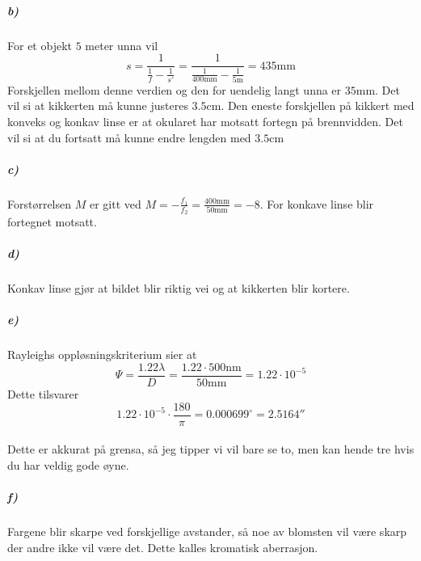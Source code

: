 \documentclass[11pt, A4paper,norsk]{article}
\begin{document}
			\subparagraph{b)}
				\begin{flushleft}
For et objekt $5$ meter unna vil
$$s = \frac{1}{\frac{1}{f} - \frac{1}{s'}} = \frac{1}{\frac{1}{400 \text{mm}} - \frac{1}{5 \text{m}}} = 435 \text{mm}$$
Forskjellen mellom denne verdien og den for uendelig langt unna er $35 \text{mm}$. Det vil si at kikkerten må kunne justeres $3.5 \text{cm}$. Den eneste forskjellen på kikkert med konveks og konkav linse er at okularet har motsatt fortegn på brennvidden. Det vil si at du fortsatt må kunne endre lengden med $3.5 \text{cm}$
				\end{flushleft}









			\subparagraph{c)}
				\begin{flushleft}
Forstørrelsen $M$ er gitt ved $M = - \frac{f_1}{f_2} = \frac{400 \text{mm}}{50 \text{mm}} = - 8$. For konkave linse blir fortegnet motsatt.
				\end{flushleft}









			\subparagraph{d)}
				\begin{flushleft}
Konkav linse gjør at bildet blir riktig vei og at kikkerten blir kortere.
				\end{flushleft}









			\subparagraph{e)}
				\begin{flushleft}
Rayleighs oppløsningskriterium sier at
$$\Psi = \frac{1.22 \lambda}{D} = \frac{1.22 \cdot 500 \text{nm}}{50 \text{mm}} = 1.22 \cdot 10^{-5}$$
Dette tilsvarer
$$1.22 \cdot 10^{-5} \cdot \frac{180}{\pi} = 0.000699^{\circ} = 2.5164''$$ \\
Dette er akkurat på grensa, så jeg tipper vi vil bare se to, men kan hende tre hvis du har veldig gode øyne.
				\end{flushleft}









			\subparagraph{f)}
				\begin{flushleft}
Fargene blir skarpe ved forskjellige avstander, så noe av blomsten vil være skarp der andre ikke vil være det. Dette kalles kromatisk aberrasjon.
				\end{flushleft}
\end{document}
